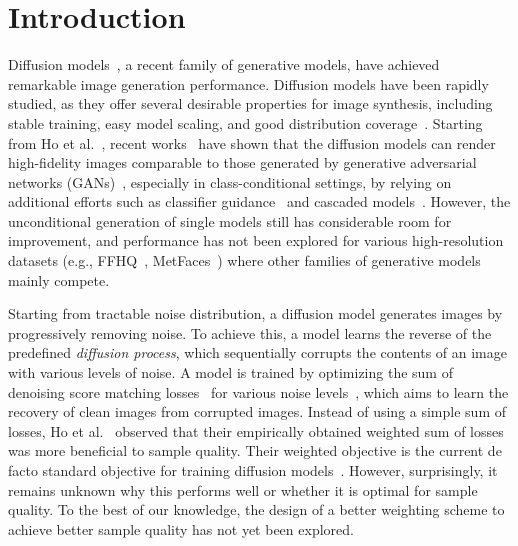 \section{Introduction}
\label{sec:intro}

Diffusion models~\cite{sohl2015deep,ho2020denoising}, a recent family of generative models, have achieved remarkable image generation performance. Diffusion models have been rapidly studied, as they offer several desirable properties for image synthesis, including stable training, easy model scaling, and good distribution coverage~\cite{nichol2021improved}. Starting from Ho et al.~\cite{ho2020denoising}, recent works~\cite{nichol2021improved,dhariwal2021diffusion,song2020score} have shown that the diffusion models can render high-fidelity images comparable to those generated by generative adversarial networks (GANs)~\cite{goodfellow2014generative}, especially in class-conditional settings, by relying on additional efforts such as classifier guidance~\cite{dhariwal2021diffusion} and cascaded models~\cite{saharia2021image}. However, the unconditional generation of single models still has considerable room for improvement, and performance has not been explored for various high-resolution datasets (e.g., FFHQ~\cite{stylegan}, MetFaces~\cite{karras2020training}) where other families of generative models~\cite{stylegan,vahdat2020nvae,kingma2018glow,esser2021taming,brock2018large} mainly compete.

Starting from tractable noise distribution, a diffusion model generates images by progressively removing noise. To achieve this, a model learns the reverse of the predefined \textit{diffusion process}, which sequentially corrupts the contents of an image with various levels of noise. A model is trained by optimizing the sum of denoising score matching losses~\cite{vincent2011connection} for various noise levels~\cite{song2019generative}, which aims to learn the recovery of clean images from corrupted images. 
Instead of using a simple sum of losses, Ho et al.~\cite{ho2020denoising} observed that their empirically obtained weighted sum of losses was more beneficial to sample quality. Their weighted objective is the current de facto standard objective for training diffusion models~\cite{nichol2021improved,dhariwal2021diffusion,kong2020diffwave,saharia2021image,song2020score}. However, surprisingly, it remains unknown why this performs well or whether it is optimal for sample quality. To the best of our knowledge, the design of a better weighting scheme to achieve better sample quality has not yet been explored.

